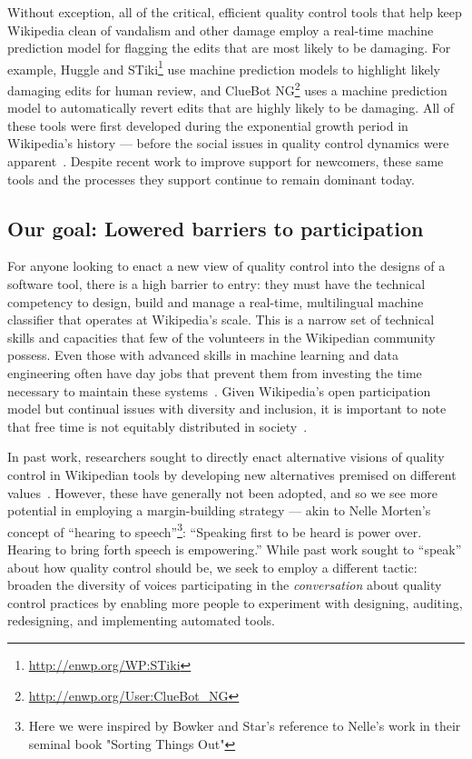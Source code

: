 Without exception, all of the critical, efficient quality control tools that help keep Wikipedia clean of vandalism and other damage employ a real-time machine prediction model for flagging the edits that are most likely to be damaging. For example, Huggle and STiki\footnote{\url{http://enwp.org/WP:STiki}} use machine prediction models to highlight likely damaging edits for human review, and ClueBot NG\footnote{\url{http://enwp.org/User:ClueBot_NG}} uses a machine prediction model to automatically revert edits that are highly likely to be damaging.  All of these tools were first developed during the exponential growth period in Wikipedia's history --- before the social issues in quality control dynamics were apparent~\cite{halfaker2013rise}. Despite recent work to improve support for newcomers, these same tools and the processes they support continue to remain dominant today.  

\subsection{Our goal: Lowered barriers to participation}
For anyone looking to enact a new view of quality control into the designs of a software tool, there is a high barrier to entry: they must have the technical competency to design, build and manage a real-time, multilingual machine classifier that operates at Wikipedia's scale.  This is a narrow set of technical skills and capacities that few of the volunteers in the Wikipedian community possess.  Even those with advanced skills in machine learning and data engineering often have day jobs that prevent them from investing the time necessary to maintain these systems~\cite{sculley2015hidden}. Given Wikipedia's open participation model but continual issues with diversity and inclusion, it is important to note that free time is not equitably distributed in society~\citep{Bianchi2010}. 

In past work, researchers sought to directly enact alternative visions of quality control in Wikipedian tools by developing new alternatives premised on different values~\cite{halfaker2014snuggle}. However, these have generally not been adopted, and so we see more potential in employing a margin-building strategy --- akin to Nelle Morten's concept of ``hearing to speech''\footnote{Here we were inspired by Bowker and Star's reference to Nelle's work in their seminal book "Sorting Things Out"\cite{bowker1999sorting}}\cite{morton1985journey}: ``Speaking first to be heard is power over. Hearing to bring forth speech is empowering.''  While past work sought to ``speak'' about how quality control should be, we seek to employ a different tactic: broaden the diversity of voices participating in the \emph{conversation} about quality control practices by enabling more people to experiment with designing, auditing, redesigning, and implementing automated tools. 

